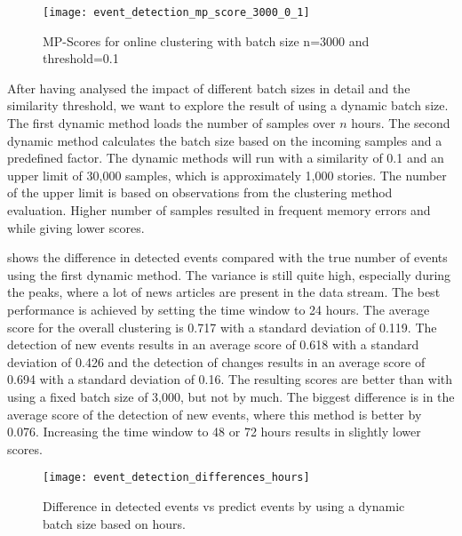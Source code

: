 \begin{figure}[h]
    \centering
    \texttt{[image: event\_detection\_mp\_score\_3000\_0\_1]}
    \caption{MP-Scores for online clustering with batch size n=3000 and threshold=0.1}
    \label{fig:event_detection_mp_score_3000_0_1}
\end{figure}

After having analysed the impact of different batch sizes in detail and the similarity threshold,
we want to explore the result of using a dynamic batch size.
The first dynamic method loads the number of samples over $n$ hours.
The second dynamic method calculates the batch size based on the incoming samples and a predefined factor.
The dynamic methods will run with a similarity of 0.1 and an upper limit of 30,000 samples,
which is approximately 1,000 stories.
The number of the upper limit is based on observations from the clustering method evaluation.
Higher number of samples resulted in frequent memory errors and while giving lower scores.

 shows the difference in detected events
compared with the true number of events using the first dynamic method.
The variance is still quite high, especially during the peaks,
where a lot of news articles are present in the data stream.
The best performance is achieved by setting the time window to 24 hours.
The average score for the overall clustering is 0.717 with a standard deviation of 0.119.
The detection of new events results in an average score of 0.618 with a standard deviation of 0.426
and the detection of changes results in an average score of 0.694 with a standard deviation of 0.16.
The resulting scores are better than with using a fixed batch size of 3,000, but not by much.
The biggest difference is in the average score of the detection of new events,
where this method is better by 0.076.
Increasing the time window to 48 or 72 hours results in slightly lower scores.

\begin{figure}[h]
    \centering
    \texttt{[image: event\_detection\_differences\_hours]}
    \caption{Difference in detected events vs predict events by using a dynamic batch size based on hours.}
    \label{fig:event_detection_differences_hours}
\end{figure}

